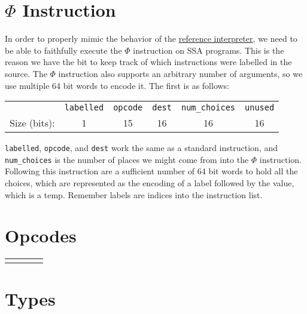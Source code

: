 \documentclass{article}
\newcommand{\refint}{\href{https://capra.cs.cornell.edu/bril/tools/interp.html}
  {reference interpreter}}
\begin{document}
\section{$\Phi$ Instruction}
In order to properly mimic the behavior of the \refint, we need to be able to
faithfully execute the $\Phi$ instruction on SSA programs. This is the reason we
have the bit to keep track of which instructions were labelled in the
source. The $\Phi$ instruction also supports an arbitrary number of arguments,
so we use multiple 64 bit words to encode it. The first is as follows:
\begin{center}
  \begin{tabular}{r|c|c|c|c|c|}
    \cline{2-6}
    & \texttt{labelled} & \texttt{opcode} & \texttt{dest} & \texttt{num\_choices}
    & \texttt{unused} \\ \cline{2-6}
    Size (bits): & 1 & 15 & 16 & 16 & 16 \\ \cline{2-6}
  \end{tabular}
\end{center}
\texttt{labelled}, \texttt{opcode}, and \texttt{dest} work the same as a standard
instruction, and \texttt{num\_choices} is the number of places we might come
from into the $\Phi$ instruction. Following this instruction are a sufficient
number of 64 bit words to hold all the choices, which are represented as the
encoding of a label followed by the value, which is a temp. Remember labels are
indices into the instruction list.
\begin{appendices}
\section{Opcodes}
\label{app:opcodes}
\begin{tabular}{cccc}
  \begin{minipage}{.25\linewidth}
    
  \end{minipage}
  &
    \begin{minipage}{.25\linewidth}
      
    \end{minipage}
  &
    \begin{minipage}{.25\linewidth}
      
    \end{minipage}
  &
    \begin{minipage}{.25\linewidth}
      
    \end{minipage}
\end{tabular}
  \begin{minipage}{\linewidth}
    \section{Types}
    \label{app:types}
    \begin{center}
      
    \end{center}
  \end{minipage}
\end{appendices}
\end{document}
